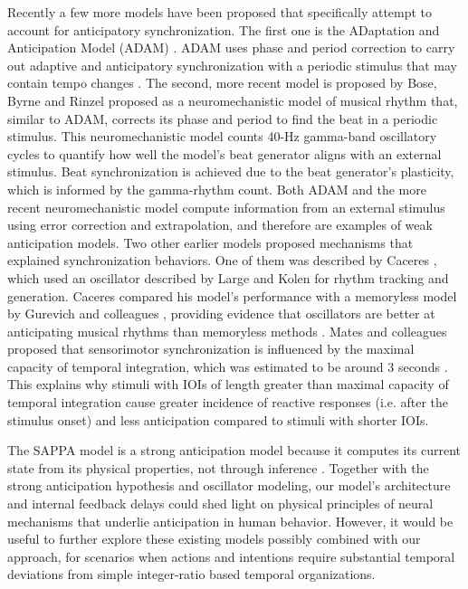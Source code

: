 \documentclass{report}
\begin{document}
Recently a few more models have been proposed that specifically attempt to account for anticipatory synchronization. The first one is the ADaptation and Anticipation Model (ADAM) \cite{van2013adaptation}. ADAM uses phase and period correction to carry out adaptive and anticipatory synchronization with a periodic stimulus that may contain tempo changes \cite{van2013adaptation}. The second, more recent model is proposed by Bose, Byrne and Rinzel \cite{bose2019neuromechanistic} proposed as a neuromechanistic model of musical rhythm that, similar to ADAM, corrects its phase and period to find the beat in a periodic stimulus. This neuromechanistic model counts 40-Hz gamma-band oscillatory cycles to quantify how well the model’s beat generator aligns with an external stimulus. Beat synchronization is achieved due to the beat generator’s plasticity, which is informed by the gamma-rhythm count. Both ADAM and the more recent neuromechanistic model compute information from an external stimulus using error correction and extrapolation, and therefore are examples of weak anticipation models. Two other earlier models proposed mechanisms that explained synchronization behaviors. One of them was described by Caceres \cite{caceres2013synchronization}, which used an oscillator described by Large and Kolen \cite{large1994resonance} for rhythm tracking and generation. Caceres compared his model’s performance with a memoryless model by Gurevich and colleagues \cite{gurevish2004simulation}, providing evidence that oscillators are better at anticipating musical rhythms than memoryless methods \cite{caceres2013synchronization}. Mates and colleagues proposed that sensorimotor synchronization is influenced by the maximal capacity of temporal integration, which was estimated to be around 3 seconds \cite{mates1994temporal}. This explains why stimuli with IOIs of length greater than maximal capacity of temporal integration cause greater incidence of reactive responses (i.e. after the stimulus onset) and less anticipation compared to stimuli with shorter IOIs.

The SAPPA model is a strong anticipation model because it computes its current state from its physical properties, not through inference \cite{dubois2001incursive,stepp2010strong}. Together with the strong anticipation hypothesis and oscillator modeling, our model’s architecture and internal feedback delays could shed light on physical principles of neural mechanisms that underlie anticipation in human behavior. However, it would be useful to further explore these existing models possibly combined with our approach, for scenarios when actions and intentions require substantial temporal deviations from simple integer-ratio based temporal organizations.
\end{document}
